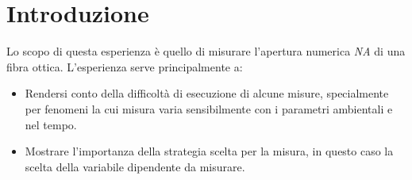 \section{Introduzione}

Lo scopo di questa esperienza è quello di misurare l'apertura numerica \emph{NA} di una fibra ottica. L'esperienza serve principalmente a:

\begin{itemize}
    \item{Rendersi conto della difficoltà di esecuzione di alcune misure, specialmente per fenomeni
        la cui misura varia sensibilmente con i parametri ambientali e nel tempo.}
    \item{Mostrare l'importanza della strategia scelta per la misura, in questo caso la scelta della variabile dipendente da misurare.}
\end{itemize}
